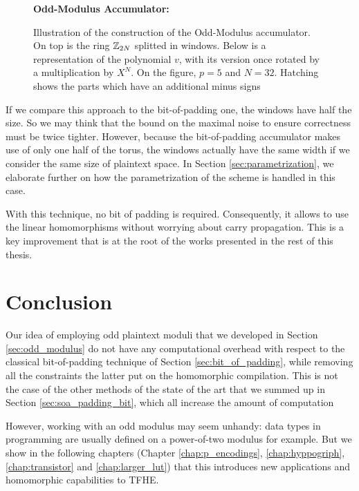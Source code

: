 \begin{figure}[H]
	\centering
	
	\vspace{1.5em}
%	
	\textbf{Odd-Modulus Accumulator:}\\[0.5em]
%	
	\caption{Illustration of the construction of the Odd-Modulus accumulator. On top is the ring $\mathbb{Z}_{2N}$ splitted in windows. Below is a representation of the polynomial $v$, with its version once rotated by a multiplication by $X^N$. On the figure, $p = 5$ and $N = 32$. Hatching shows the parts which have an additional minus signs}
	\label{fig:accumulator_odd}
\end{figure}


If we compare this approach to the bit-of-padding one, the windows have half the size. So we may think that the bound on the maximal noise to ensure correctness must be twice tighter. However, because the bit-of-padding accumulator makes use of only one half of the torus, the windows actually have the same width if we consider the same size of plaintext space. In Section \ref{sec:parametrization}, we elaborate further on how the parametrization of the scheme is handled in this case.


With this technique, no bit of padding is required. Consequently, it allows to use the linear homomorphisms without worrying about carry propagation. This is a key improvement that is at the root of the works presented in the rest of this thesis.





\section{Conclusion}

Our idea of employing odd plaintext moduli that we developed in Section \ref{sec:odd_modulus} do not have any computational overhead with respect to the classical bit-of-padding technique of Section \ref{sec:bit_of_padding}, while removing all the constraints the latter put on the homomorphic compilation. This is not the case of the other methods of the state of the art that we summed up in Section \ref{sec:soa_padding_bit}, which all increase the amount of computation 

However, working with an odd modulus may seem unhandy: data types in programming are usually defined on a power-of-two modulus for example. But we show in the following chapters (Chapter \ref{chap:p_encodings}, \ref{chap:hyppogriph}, \ref{chap:transistor} and \ref{chap:larger_lut}) that this introduces new applications and homomorphic capabilities to TFHE.

